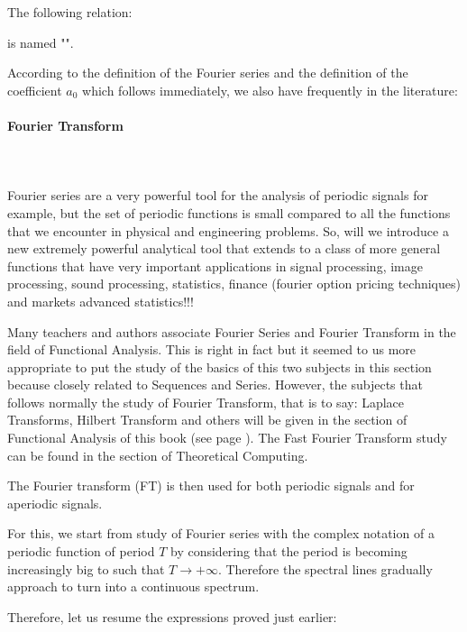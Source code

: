 	The following relation:
	
	is named "".
	
	According to the definition of the Fourier series and the definition of the coefficient $a_0$ which follows immediately, we also have frequently in the literature:
	
	
	
	\pagebreak
	\paragraph{Fourier Transform}\label{fourier transform}\mbox{}\\\\
	Fourier series are a very powerful tool for the analysis of periodic signals for example, but the set of periodic functions is small compared to all the functions that we encounter in physical and engineering problems. So, will we introduce a new extremely powerful analytical tool that extends to a class of more general functions that have very important applications in signal processing, image processing, sound processing, statistics, finance (fourier option pricing techniques) and markets advanced statistics!!!
	
	\begin{tcolorbox}[title=Remark,colframe=black,arc=10pt]
	Many teachers and authors associate Fourier Series and Fourier Transform in the field of Functional Analysis. This is right in fact but it seemed to us more appropriate to put the study of the basics of this two subjects in this section because closely related to Sequences and Series. However, the subjects that follows normally the study of Fourier Transform, that is to say: Laplace Transforms, Hilbert Transform and others will be given in the section of Functional Analysis of this book (see page \pageref{fourier transform analysis}). The Fast Fourier Transform study can be found in the section of Theoretical Computing.
	\end{tcolorbox}
	The Fourier transform (FT) is then used for both periodic signals and for aperiodic signals.
	
	For this, we start from study of Fourier series with the complex notation of a periodic function of period $T$ by considering that the period is becoming increasingly big to such that $T\rightarrow +\infty$. Therefore the spectral lines gradually approach to turn into a continuous spectrum.
	
	Therefore, let us resume the expressions proved just earlier:
	
